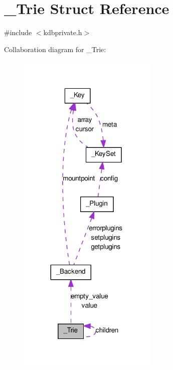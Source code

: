 \hypertarget{struct__Trie}{
\section{\_\-Trie Struct Reference}
\label{struct__Trie}
}


{\ttfamily \#include $<$kdbprivate.h$>$}



Collaboration diagram for \_\-Trie:
\nopagebreak
\begin{figure}[H]
\begin{center}
\leavevmode
\includegraphics[width=188pt]{struct__Trie__coll__graph}
\end{center}
\end{figure}
